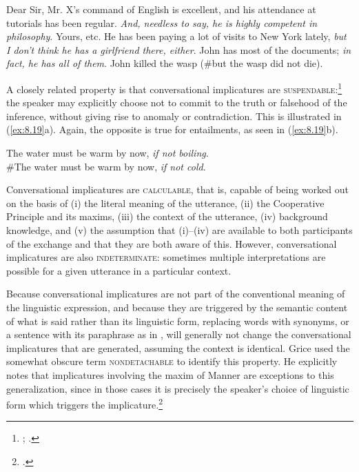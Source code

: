 \ea \label{ex:8.17}
\ea  Dear Sir, Mr. X’s command of English is excellent, and his attendance at tutorials has been regular. \textit{And, needless to say, he is highly competent in philosophy}. Yours, etc.
\ex He has been paying a lot of visits to New York lately, \textit{but I don’t think he has a girlfriend there, either}.
\ex John has most of the documents; \textit{in fact, he has all of them}.
\z \z
\ea \label{ex:8.18}
John killed the wasp (\#but the wasp did not die).
\z 


A closely related property is that conversational implicatures are \textsc{suspendable}:\footnote{\citet{Horn1972}; \citet{Sadock1978}.} the speaker may explicitly choose not to commit to the truth or falsehood of the inference, without giving rise to anomaly or contradiction. This is illustrated in (\ref{ex:8.19}a). Again, the opposite is true for entailments, as seen in (\ref{ex:8.19}b).


\ea \label{ex:8.19}
\ea The water must be warm by now, \textit{if not boiling}.\\
\ex \#The water must be warm by now, \textit{if not cold}.
                       \z
\z


Conversational implicatures are \textsc{calculable}, that is, capable of being worked out on the basis of (i) the literal meaning of the utterance, (ii) the Cooperative Principle and its maxims, (iii) the context of the utterance, (iv) background knowledge, and (v) the assumption that (i)--(iv) are available to both participants of the exchange and that they are both aware of this. However, conversational implicatures are also \textsc{indeterminate}: sometimes multiple interpretations are possible for a given utterance in a particular context.



Because conversational implicatures are not part of the conventional meaning of the linguistic expression, and because they are triggered by the semantic content of what is said rather than its linguistic form, replacing words with synonyms, or a sentence with its paraphrase as in , will generally not change the conversational implicatures that are generated, assuming the context is identical. Grice used the somewhat obscure term \textsc{nondetachable} to identify this property. He explicitly notes that implicatures involving the maxim of Manner are exceptions to this generalization, since in those cases it is precisely the speaker’s choice of linguistic form which triggers the implicature.\footnote{\citet[58]{Grice1975}.}


